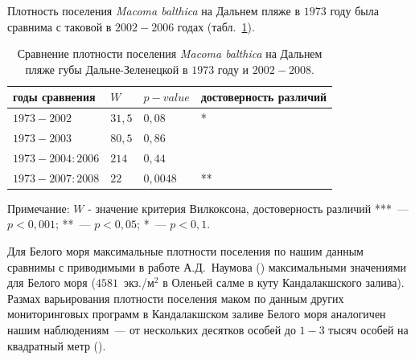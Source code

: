 Плотность поселения {\it Macoma balthica} на Дальнем пляже в $1973$ году была сравнима с таковой в $2002-2006$ годах (табл.~\ref{tab:DZ_N_1973_sravnenie}).
	\begin{table}[p]
	\caption{Сравнение плотности поселения {\it Macoma balthica} на Дальнем пляже губы Дальне-Зеленецкой в $1973$ году и $2002-2008$.}
	\label{tab:DZ_N_1973_sravnenie}
	\begin{tabularx}{\textwidth}{|*{4}{X|}} \hline
	годы сравнения & $W$ & $p-value$ & достоверность различий \\ 
	\hline
	$1973 - 2002$ & $31,5$ & $0,08$ & *\\
	\hline
	$1973 - 2003$ & $80,5$ & $0,86$ & \\
	\hline
	$1973 - 2004:2006$ &  $214$ & $0,44$ & \\
	\hline
	$1973 - 2007:2008$ & $22$ & $0,0048$ & ** \\
	\hline
	\end{tabularx}
	{\footnotesize Примечание: $W$ - значение критерия Вилкоксона, достоверность различий ***~--- $p<0,001$; **~--- $p<0,05$; *~--- $p<0,1$.}
	\end{table}


Для Белого моря максимальные плотности поселения по нашим данным сравнимы с приводимыми в работе А.Д.~Наумова (\cite{Naumov_2006}) максимальными значениями для Белого моря ($4581$~экз./м$^2$ в Оленьей салме в куту Кандалакшского залива). 
Размах варьирования плотности поселения маком по данным других мониторинговых программ в Кандалакшском заливе Белого моря аналогичен нашим наблюдениям~--- от нескольких десятков особей до $1-3$ тысяч особей на квадратный метр (\cite{Semenova_1974, Maximovich_et_al_1991, Varfolomeeva_Naumov_2013}). 



